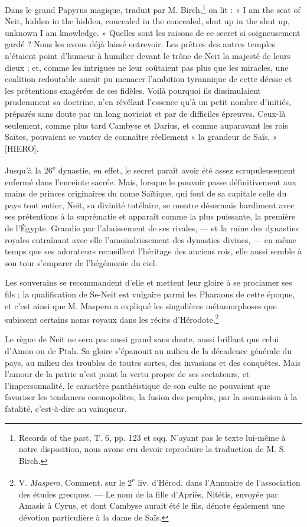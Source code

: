 \documentclass[a4paper, 11pt, oneside]{article}
\begin{document}
Dans le grand Papyrus magique, traduit par M. Birch,\footnote{Records of the past, T. 6, pp. 123 et sqq. N'ayant pas le texte lui-même à notre disposition, nous avons cru devoir reproduire la traduction de M. S. Birch.} on lit : « I am the seat of Neit, hidden in the hidden, concealed in the concealed, shut up in the shut up, unknown I am knowledge. » Quelles sont les raisons de ce secret si soigneusement gardé ? Nous les avons déjà laissé entrevoir. Les prêtres des autres temples n'étaient point d'humeur à humilier devant le trône de Neit la majesté de leurs dieux ; et, comme les intrigues ne leur coûtaient pas plus que les miracles, une coalition redoutable aurait pu menacer l'ambition tyrannique de cette déesse et les prétentions exagérées de ses fidèles. Voilà pourquoi ils dissimulaient prudemment sa doctrine, n'en révélant l'essence qu'à un petit nombre d'initiés, préparés sans doute par un long noviciat et par de difficiles épreuves. Ceux-là seulement, comme plus tard Cambyse et Darius, et comme auparavant les rois Saïtes, pouvaient se vanter de connaître réellement « la grandeur de Saïs, » [HIERO].

Jusqu'à la 26\textsuperscript{e} dynastie, en effet, le secret paraît avoir été assez scrupuleusement enfermé dans l'enceinte sacrée. Mais, lorsque le pouvoir passe définitivement aux mains de princes originaires du nome Saïtique, qui font de sa capitale celle du pays tout entier, Neit, sa divinité tutélaire, se montre désormais hardiment avec ses prétentions à la suprématie et apparaît comme la plus puissante, la première de l'Égypte. Grandie par l'abaissement de ses rivales, --- et la ruine des dynasties royales entraînant avec elle l'amoindrissement des dynasties divines, --- en même temps que ses adorateurs recueillent l'héritage des anciens rois, elle aussi semble à son tour s'emparer de l'hégémonie du ciel.

Les souverains se recommandent d'elle et mettent leur gloire à se proclamer ses fils ; la qualification de Se-Neit est vulgaire parmi les Pharaons de cette époque, et c'est ainsi que M. Maspero a expliqué les singulières métamorphoses que subissent certains noms royaux dans les récits d'Hérodote.\footnote{V. \emph{Maspero}, Comment. sur le 2\textsuperscript{e} liv. d'Hérod. dans l'Annuaire de l'association des études grecques. --- Le nom de la fille d'Apriès, Nitétis, envoyée par Amasis à Cyrus, et dont Cambyse aurait été le fils, dénote également une dévotion particulière à la dame de Saïs.}

Le règne de Neit ne sera pas aussi grand sans doute, aussi brillant que celui d'Amon ou de Ptah. Sa gloire s'épanouit au milieu de la décadence générale du pays, au milieu des troubles de toutes sortes, des invasions et des conquêtes. Mais l'amour de la patrie n'est point la vertu propre de ses sectateurs, et l'impersonnalité, le caractère panthéistique de son culte ne pouvaient que favoriser les tendances cosmopolites, la fusion des peuples, par la soumission à la fatalité, c'est-à-dire au vainqueur.
\end{document}
